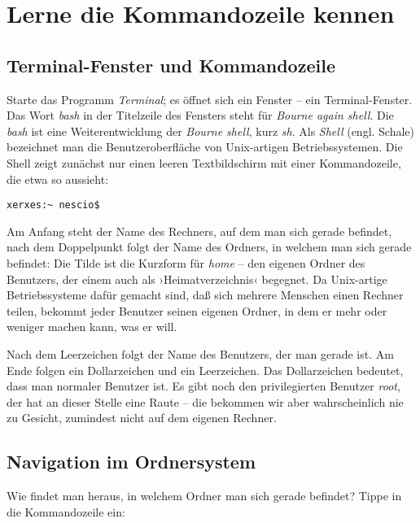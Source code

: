 
\chapter{Lerne die Kommandozeile kennen}

\section{Terminal-Fenster und Kommandozeile}

Starte das Programm \emph{Terminal}; es öffnet sich ein Fenster – ein Terminal-Fenster. Das Wort \emph{bash} in der Titelzeile des Fensters steht für \emph{Bourne again shell}. Die \emph{bash} ist eine Weiterentwicklung der \emph{Bourne shell}, kurz \emph{sh}. Als \emph{Shell} (engl. Schale) bezeichnet man die Benutzeroberfläche von Unix-artigen Betriebssystemen. Die Shell zeigt zunächst nur einen leeren Textbildschirm mit einer Kommandozeile, die etwa so aussieht:

\begin{verbatim}
xerxes:~ nescio$
\end{verbatim}

\noindent Am Anfang steht der Name des Rechners, auf dem man sich gerade befindet, nach dem Doppelpunkt folgt der Name des Ordners, in welchem man sich gerade befindet: Die Tilde ist die Kurzform für \emph{home} – den eigenen Ordner des Benutzers, der einem auch als ›Heimatverzeichnis‹ begegnet. Da Unix-artige Betriebssysteme dafür gemacht sind, daß sich mehrere Menschen einen Rechner teilen, bekommt jeder Benutzer seinen eigenen Ordner, in dem er mehr oder weniger machen kann, was er will. 

Nach dem Leerzeichen folgt der Name des Benutzers, der man gerade ist. Am Ende folgen ein Dollarzeichen und ein Leerzeichen. Das Dollarzeichen bedeutet, dass man normaler Benutzer ist. Es gibt noch den privilegierten Benutzer \emph{root}, der hat an dieser Stelle eine Raute – die bekommen wir aber wahrscheinlich nie zu Gesicht, zumindest nicht auf dem eigenen Rechner.

\section{Navigation im Ordnersystem}

Wie findet man heraus, in welchem Ordner man sich gerade befindet? Tippe in die Kommandozeile ein:

